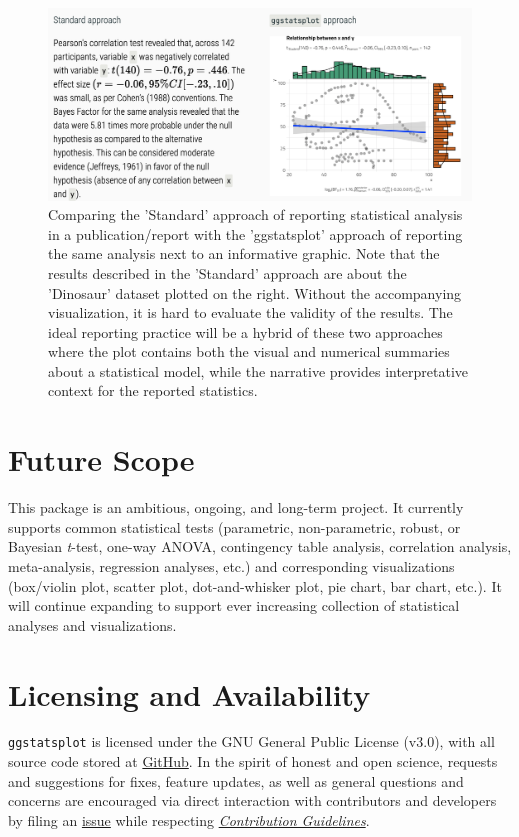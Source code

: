 \documentclass[
]{article}
\begin{document}
\begin{figure}
\includegraphics[width=1\linewidth]{reporting} \caption{Comparing the 'Standard' approach of reporting statistical analysis in a publication/report with the 'ggstatsplot' approach of reporting the same analysis next to an informative graphic. Note that the results described in the 'Standard' approach are about the 'Dinosaur' dataset plotted on the right. Without the accompanying visualization, it is hard to evaluate the validity of the results. The ideal reporting practice will be a hybrid of these two approaches where the plot contains both the visual and numerical summaries about a statistical model, while the narrative provides interpretative context for the reported statistics.}\label{fig:reporting}
\end{figure}

\hypertarget{future-scope}{%
\section{Future Scope}\label{future-scope}}

This package is an ambitious, ongoing, and long-term project. It
currently supports common statistical tests (parametric, non-parametric,
robust, or Bayesian \emph{t}-test, one-way ANOVA, contingency table
analysis, correlation analysis, meta-analysis, regression analyses,
etc.) and corresponding visualizations (box/violin plot, scatter plot,
dot-and-whisker plot, pie chart, bar chart, etc.). It will continue
expanding to support ever increasing collection of statistical analyses
and visualizations.

\hypertarget{licensing-and-availability}{%
\section{Licensing and Availability}\label{licensing-and-availability}}

\texttt{ggstatsplot} is licensed under the GNU General Public License
(v3.0), with all source code stored at
\href{https://github.com/IndrajeetPatil/ggstatsplot/}{GitHub}. In the
spirit of honest and open science, requests and suggestions for fixes,
feature updates, as well as general questions and concerns are
encouraged via direct interaction with contributors and developers by
filing an
\href{https://github.com/IndrajeetPatil/ggstatsplot/issues}{issue} while
respecting
\href{https://indrajeetpatil.github.io/ggstatsplot/CONTRIBUTING.html}{\emph{Contribution
Guidelines}}.
\end{document}
